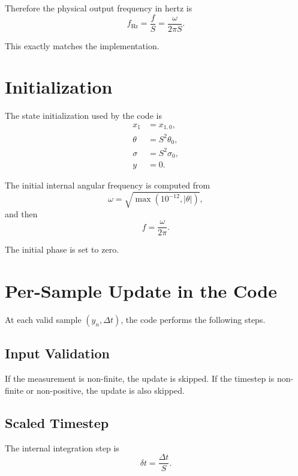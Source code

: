 \documentclass[conference]{IEEEtran}
\begin{document}
    Therefore the physical output frequency in hertz is
    \begin{equation}
        f_{\text{Hz}} = \frac{f}{S}
        = \frac{\omega}{2\pi S}.
    \end{equation}

    This exactly matches the implementation.

    \section{Initialization}

    The state initialization used by the code is
    \begin{align}
        x_1 &= x_{1,0},\\
        \theta &= S^2 \theta_0,\\
        \sigma &= S^2 \sigma_0,\\
        y &= 0.
    \end{align}

    The initial internal angular frequency is computed from
    \begin{equation}
        \omega = \sqrt{\max\!\left(10^{-12}, |\theta|\right)},
    \end{equation}
    and then
    \begin{equation}
        f = \frac{\omega}{2\pi}.
    \end{equation}

    The initial phase is set to zero.

    \section{Per-Sample Update in the Code}

    At each valid sample $(y_n,\Delta t)$, the code performs the following steps.

    \subsection{Input Validation}

    If the measurement is non-finite, the update is skipped. If the timestep is
    non-finite or non-positive, the update is also skipped.

    \subsection{Scaled Timestep}

    The internal integration step is
    \begin{equation}
        \delta t = \frac{\Delta t}{S}.
    \end{equation}
\end{document}
